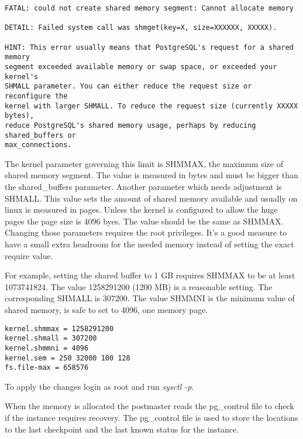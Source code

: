 \begin{verbatim}
FATAL: could not create shared memory segment: Cannot allocate memory

DETAIL: Failed system call was shmget(key=X, size=XXXXXX, XXXXX).

HINT: This error usually means that PostgreSQL's request for a shared memory
segment exceeded available memory or swap space, or exceeded your kernel's
SHMALL parameter. You can either reduce the request size or reconfigure the
kernel with larger SHMALL. To reduce the request size (currently XXXXX bytes),
reduce PostgreSQL's shared memory usage, perhaps by reducing shared_buffers or
max_connections.
\end{verbatim}


The kernel parameter governing this limit is SHMMAX, the maximum size of
shared memory segment. The value is measured in bytes and must be bigger than the shared\_buffers
parameter. Another parameter which needs adjustment is SHMALL. This value sets the amount of shared
memory available and usually on linux is measured in pages. Unless the kernel is configured to
allow the huge pages the page size is 4096 byes. The value should be the same as SHMMAX. Changing
those parameters requires the root privileges. It's a good measure to have a small extra headroom
for the needed memory instead of setting the exact require value. \newline

For example, setting the shared buffer to 1 GB requires SHMMAX to be at least 1073741824.
The value 1258291200 (1200 MB) is a reasonable setting. The corresponding SHMALL is 307200. The
value SHMMNI is the minimum value of shared memory, is safe to set to 4096, one memory page.

\begin{verbatim}
kernel.shmmax = 1258291200
kernel.shmall = 307200
kernel.shmmni = 4096
kernel.sem = 250 32000 100 128
fs.file-max = 658576
\end{verbatim}

To apply the changes login as root and run \textit{sysctl -p}.\newline


When the memory is allocated the postmaster reads the pg\_control
file to check if the instance requires recovery. The pg\_control file is used to store the locations
to the last checkpoint and the last known status for the instance.\newline

